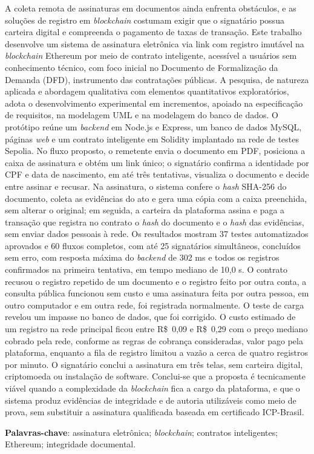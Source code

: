 \documentclass[
    12pt,
    a4paper,
    oneside,
    chapter=TITLE,
    section=TITLE,
    subsection=TITLE,
    subsubsection=TITLE,
    sumario=tradicional,
    english,
    brazil
]{abntex2}
\begin{document}
\begin{resumo}
A coleta remota de assinaturas em documentos ainda enfrenta obstáculos, e as soluções de registro em \emph{blockchain} costumam exigir que o signatário possua carteira digital e compreenda o pagamento de taxas de transação. Este trabalho desenvolve um sistema de assinatura eletrônica via link com registro imutável na \emph{blockchain} Ethereum por meio de contrato inteligente, acessível a usuários sem conhecimento técnico, com foco inicial no Documento de Formalização da Demanda (DFD), instrumento das contratações públicas. A pesquisa, de natureza aplicada e abordagem qualitativa com elementos quantitativos exploratórios, adota o desenvolvimento experimental em incrementos, apoiado na especificação de requisitos, na modelagem UML e na modelagem do banco de dados. O protótipo reúne um \emph{backend} em Node.js e Express, um banco de dados MySQL, páginas \emph{web} e um contrato inteligente em Solidity implantado na rede de testes Sepolia. No fluxo proposto, o remetente envia o documento em PDF, posiciona a caixa de assinatura e obtém um link único; o signatário confirma a identidade por CPF e data de nascimento, em até três tentativas, visualiza o documento e decide entre assinar e recusar. Na assinatura, o sistema confere o \emph{hash} SHA-256 do documento, coleta as evidências do ato e gera uma cópia com a caixa preenchida, sem alterar o original; em seguida, a carteira da plataforma assina e paga a transação que registra no contrato o \emph{hash} do documento e o \emph{hash} das evidências, sem enviar dados pessoais à rede. Os resultados mostram 37 testes automatizados aprovados e 60 fluxos completos, com até 25 signatários simultâneos, concluídos sem erro, com resposta máxima do \emph{backend} de 302 ms e todos os registros confirmados na primeira tentativa, em tempo mediano de 10,0 s. O contrato recusou o registro repetido de um documento e o registro feito por outra conta, a consulta pública funcionou sem custo e uma assinatura feita por outra pessoa, em outro computador e em outra rede, foi registrada normalmente. O teste de carga revelou um impasse no banco de dados, que foi corrigido. O custo estimado de um registro na rede principal ficou entre R\$~0,09 e R\$~0,29 com o preço mediano cobrado pela rede, conforme as regras de cobrança consideradas, valor pago pela plataforma, enquanto a fila de registro limitou a vazão a cerca de quatro registros por minuto. O signatário conclui a assinatura em três telas, sem carteira digital, criptomoeda ou instalação de software. Conclui-se que a proposta é tecnicamente viável quando a complexidade da \emph{blockchain} fica a cargo da plataforma, e que o sistema produz evidências de integridade e de autoria utilizáveis como meio de prova, sem substituir a assinatura qualificada baseada em certificado ICP-Brasil.

\textbf{Palavras-chave}: assinatura eletrônica; \emph{blockchain}; contratos inteligentes; Ethereum; integridade documental.
\end{resumo}
\end{document}
